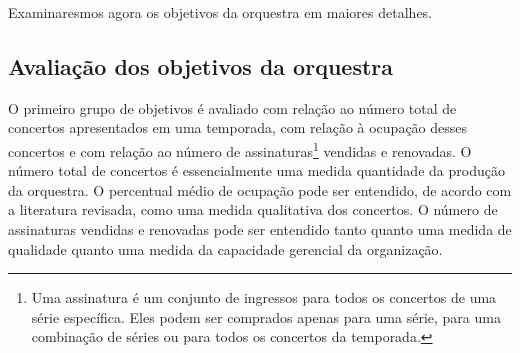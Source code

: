 \documentclass[a4paper, 12pt, openright, oneside, german, french, english, brazil]{abntex2}
\begin{document}
	Examinaresmos agora os objetivos da orquestra em maiores detalhes.
	
	\subsection{Avaliação dos objetivos da orquestra}
	
	
	O primeiro grupo de objetivos é avaliado com relação ao número total de concertos apresentados em uma temporada, com relação à ocupação desses concertos e com relação ao número de assinaturas\footnote{Uma assinatura é um conjunto de ingressos para todos os concertos de uma série específica. Eles podem ser comprados apenas para uma série, para uma combinação de séries ou para todos os concertos da temporada.} vendidas e renovadas. O número total de concertos é essencialmente uma medida quantidade da produção da orquestra. O percentual médio de ocupação pode ser entendido, de acordo com a literatura revisada, como uma medida qualitativa dos concertos. O número de assinaturas vendidas e renovadas pode ser entendido tanto quanto uma medida de qualidade quanto uma medida da capacidade gerencial da organização.
	
	
\end{document}
